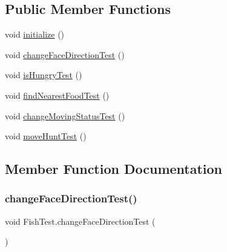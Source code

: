 \subsection*{Public Member Functions}
\begin{DoxyCompactItemize}
\item 
void \mbox{\hyperlink{class_fish_test_a4bc3ecb470863af45697d2dc6b7c7542}{initialize}} ()
\item 
void \mbox{\hyperlink{class_fish_test_ab32157a943c6a965e7feb4c04ffa503c}{change\+Face\+Direction\+Test}} ()
\item 
void \mbox{\hyperlink{class_fish_test_a1419dfc65a3ea1fd0c4f40a4e611320d}{is\+Hungry\+Test}} ()
\item 
void \mbox{\hyperlink{class_fish_test_af6db6a8b19fbc092877837f98576f3a8}{find\+Nearest\+Food\+Test}} ()
\item 
void \mbox{\hyperlink{class_fish_test_af7d7685db2f835899b3374243e47cc20}{change\+Moving\+Status\+Test}} ()
\item 
void \mbox{\hyperlink{class_fish_test_ac85858cd7b8d49b0490e4ef1221e3bef}{move\+Hunt\+Test}} ()
\end{DoxyCompactItemize}


\subsection{Member Function Documentation}
\mbox{\label{class_fish_test_ab32157a943c6a965e7feb4c04ffa503c}} 
\subsubsection{\texorpdfstring{change\+Face\+Direction\+Test()}{changeFaceDirectionTest()}}
{\footnotesize\ttfamily void Fish\+Test.\+change\+Face\+Direction\+Test (\begin{DoxyParamCaption}{ }\end{DoxyParamCaption})\hspace{0.3cm}{\ttfamily [inline]}}

\mbox{\label{class_fish_test_af7d7685db2f835899b3374243e47cc20}} 
